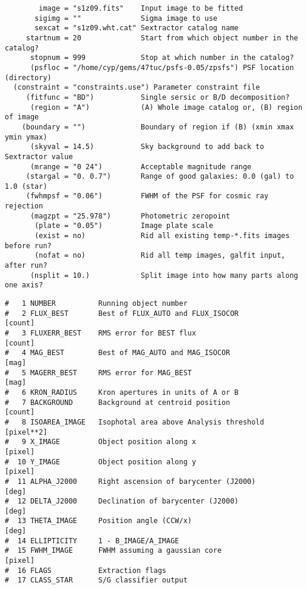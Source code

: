 \documentclass[preprint]{aastex}
\begin{document}
\begin {verbatim}
        image = "s1z09.fits"    Input image to be fitted
       sigimg = ""              Sigma image to use
       sexcat = "s1z09.wht.cat" Sextractor catalog name
     startnum = 20              Start from which object number in the catalog?
      stopnum = 999             Stop at which number in the catalog?
      (psfloc = "/home/cyp/gems/47tuc/psfs-0.05/zpsfs") PSF location (directory)
  (constraint = "constraints.use") Parameter constraint file
     (fitfunc = "BD")           Single sersic or B/D decomposition?
      (region = "A")            (A) Whole image catalog or, (B) region of image
    (boundary = "")             Boundary of region if (B) (xmin xmax ymin ymax)
      (skyval = 14.5)           Sky background to add back to Sextractor value
      (mrange = "0 24")         Acceptable magnitude range
     (stargal = "0. 0.7")       Range of good galaxies: 0.0 (gal) to 1.0 (star)
     (fwhmpsf = "0.06")         FWHM of the PSF for cosmic ray rejection
      (magzpt = "25.978")       Photometric zeropoint
       (plate = "0.05")         Image plate scale
       (exist = no)             Rid all existing temp-*.fits images before run?
       (nofat = no)             Rid all temp images, galfit input, after run?
      (nsplit = 10.)            Split image into how many parts along one axis?

\end {verbatim}


\begin {verbatim}
#   1 NUMBER          Running object number
#   2 FLUX_BEST       Best of FLUX_AUTO and FLUX_ISOCOR               [count]
#   3 FLUXERR_BEST    RMS error for BEST flux                         [count]
#   4 MAG_BEST        Best of MAG_AUTO and MAG_ISOCOR                 [mag]
#   5 MAGERR_BEST     RMS error for MAG_BEST                          [mag]
#   6 KRON_RADIUS     Kron apertures in units of A or B
#   7 BACKGROUND      Background at centroid position                 [count]
#   8 ISOAREA_IMAGE   Isophotal area above Analysis threshold         [pixel**2]
#   9 X_IMAGE         Object position along x                         [pixel]
#  10 Y_IMAGE         Object position along y                         [pixel]
#  11 ALPHA_J2000     Right ascension of barycenter (J2000)           [deg]
#  12 DELTA_J2000     Declination of barycenter (J2000)               [deg]
#  13 THETA_IMAGE     Position angle (CCW/x)                          [deg]
#  14 ELLIPTICITY     1 - B_IMAGE/A_IMAGE
#  15 FWHM_IMAGE      FWHM assuming a gaussian core                   [pixel]
#  16 FLAGS           Extraction flags
#  17 CLASS_STAR      S/G classifier output
\end {verbatim}

\newpage
\end{document}
